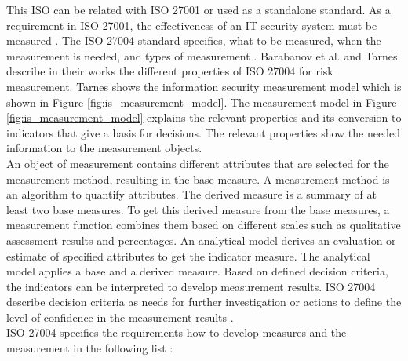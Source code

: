 This ISO can be related with ISO 27001 or used as a standalone standard. As a requirement in ISO 27001, the effectiveness of an IT security system must be measured \cite{barabanov2011information}. The ISO 27004 standard specifies, what to be measured, when the measurement is needed, and types of measurement \cite{lundholm2011design}. Barabanov et al. \cite{barabanov2011information} and
Tarnes \cite{tarnes2012information} describe in their works the different properties of ISO 27004 for risk measurement. Tarnes shows the information security measurement model which is shown in Figure \ref{fig:is_measurement_model}.
The measurement model in Figure \ref{fig:is_measurement_model} explains the relevant properties and its conversion to indicators that give a basis for decisions. The relevant properties show the needed information to the measurement objects. \\
An object of measurement contains different attributes that are selected for the measurement method, resulting in the base measure. A measurement method is an algorithm to quantify attributes. The derived measure is a summary of at least two base measures. To get this derived measure from the base measures, a measurement function combines them based on different scales such as qualitative assessment results and percentages. An analytical model derives an evaluation or estimate of specified attributes to get the indicator measure. The analytical model applies a base and a derived measure. Based on defined decision criteria, the indicators can be interpreted to develop measurement results. ISO 27004 describe decision criteria as needs for further investigation or actions to define the level of confidence in the measurement results \cite{ISO_27004_2009}. \\

ISO 27004 specifies the requirements how to develop measures and the measurement in the following list \cite{ISO_27004_2009}:


